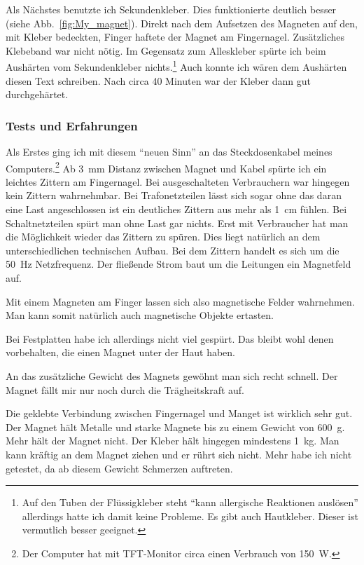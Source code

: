 Als Nächstes benutzte ich Sekundenkleber. Dies funktionierte deutlich besser
(siehe Abb.~\vref{fig:My_magnet}).
Direkt nach dem
Aufsetzen des Magneten auf den, mit Kleber bedeckten, Finger haftete der Magnet am Fingernagel.
Zusätzliches Klebeband war nicht nötig. Im Gegensatz zum Alleskleber spürte ich beim Aushärten vom
Sekundenkleber nichts.\footnote{Auf den Tuben der Flüssigkleber steht \enquote{kann
allergische Reaktionen auslösen} allerdings hatte ich damit keine Probleme. Es gibt
auch Hautkleber. Dieser ist vermutlich besser geeignet.} Auch konnte ich wären dem Aushärten
diesen Text schreiben. Nach circa 40 Minuten war der Kleber dann gut durchgehärtet.

\subsubsection{Tests und Erfahrungen}
Als Erstes ging ich mit diesem \enquote{neuen Sinn} an das Steckdosenkabel meines
Computers.\footnote{Der Computer hat mit TFT-Monitor circa einen Verbrauch von \SI{150}{\watt}.} Ab
\SI{3}{\milli\metre} Distanz zwischen Magnet und Kabel spürte ich ein leichtes Zittern am
Fingernagel. Bei ausgeschalteten Verbrauchern war hingegen kein Zittern wahrnehmbar. Bei
Trafonetzteilen lässt sich sogar ohne das daran eine Last angeschlossen ist ein deutliches Zittern
aus mehr als \SI{1}{\centi\metre} fühlen. Bei Schaltnetzteilen spürt man ohne Last gar nichts. Erst
mit Verbraucher hat man die Möglichkeit wieder das Zittern zu spüren. Dies liegt natürlich an dem
unterschiedlichen technischen Aufbau. Bei dem Zittern handelt es sich um die \SI{50}{\hertz}
Netzfrequenz. Der fließende Strom baut um die Leitungen ein Magnetfeld auf.

Mit einem Magneten am Finger lassen sich also magnetische Felder wahrnehmen. Man kann somit natürlich
auch magnetische Objekte ertasten.

Bei Festplatten habe ich allerdings nicht viel gespürt. Das bleibt wohl denen vorbehalten, die
einen Magnet unter der Haut haben.

An das zusätzliche Gewicht des Magnets gewöhnt man sich recht schnell. Der Magnet fällt mir nur noch
durch die Trägheitskraft auf.

Die geklebte Verbindung zwischen Fingernagel und Manget ist wirklich sehr gut. Der Magnet hält
Metalle und starke Magnete bis zu einem Gewicht von \SI{600}{\gram}. Mehr hält der Magnet nicht. Der
Kleber hält hingegen mindestens \SI{1}{\kilo\gram}.
Man kann kräftig an dem Magnet ziehen und er rührt sich nicht.
Mehr habe ich nicht getestet, da ab diesem
Gewicht Schmerzen auftreten.

